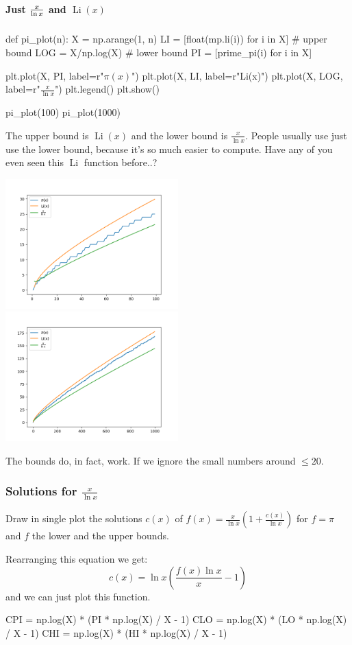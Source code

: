 \documentclass{article}
\newcommand{\Li}{\operatorname{Li}}
\begin{document}
  \paragraph*{Just $\frac{x}{\ln x}\vphantom{\dfrac{1}{2}}$ and $\Li(x)$}
  \begin{mylisting}
    def pi_plot(n):
      X = np.arange(1, n)
      LI = [float(mp.li(i)) for i in X] # upper bound
      LOG = X/np.log(X) # lower bound
      PI = [prime_pi(i) for i in X]

      plt.plot(X, PI, label=r"$\pi(x)$")
      plt.plot(X, LI, label=r"Li(x)")
      plt.plot(X, LOG, label=r"$\frac{x}{\ln x}$")
      plt.legend()
      plt.show()

    pi_plot(100)
    pi_plot(1000)
  \end{mylisting}
  The upper bound is $\Li(x)$ and the lower bound is $\frac{x}{\ln x}$.
  People usually use just use the lower bound, because it's so much easier to compute.
  Have any of you even seen this $\Li$ function before..?

  \noindent
  \includegraphics[width=0.5\textwidth]{bounds100}%
  \includegraphics[width=0.5\textwidth]{bounds1000}

  The bounds do, in fact, work.
  If we ignore the small numbers around $\leq 20$.

  \subsubsection{Solutions for $\frac{x}{\ln x}$}
  \begin{centerframebox}
    Draw in single plot the solutions $c(x)$ of $f(x) = \frac{x}{\ln x}\left(1+\frac{c(x)}{\ln x}\right)$
    for $f = \pi$ and $f$ the lower and the upper bounds.
  \end{centerframebox}
  Rearranging this equation we get:
  \[ c(x) = \ln x \left(\frac{f(x)\ln x}{x} - 1\right) \]
  and we can just plot this function.
  \begin{mylisting}
    CPI = np.log(X) * (PI * np.log(X) / X - 1)
    CLO = np.log(X) * (LO * np.log(X) / X - 1)
    CHI = np.log(X) * (HI * np.log(X) / X - 1)
  \end{mylisting}
\end{document}
